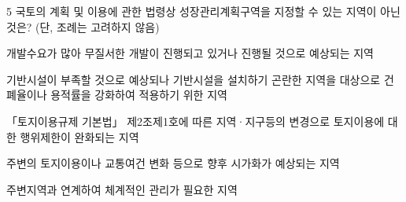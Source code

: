\begin{question}{5}
국토의 계획 및 이용에 관한 법령상 성장관리계획구역을 지정할 수 있는 지역이 아닌 것은? (단, 조례는 고려하지 않음)
\begin{choices}
  \item 개발수요가 많아 무질서한 개발이 진행되고 있거나 진행될 것으로 예상되는 지역
  \item 기반시설이 부족할 것으로 예상되나 기반시설을 설치하기 곤란한 지역을 대상으로 건폐율이나 용적률을 강화하여 적용하기 위한 지역
  \item 「토지이용규제 기본법」 제2조제1호에 따른 지역·지구등의 변경으로 토지이용에 대한 행위제한이 완화되는 지역
  \item 주변의 토지이용이나 교통여건 변화 등으로 향후 시가화가 예상되는 지역
  \item 주변지역과 연계하여 체계적인 관리가 필요한 지역
\end{choices}
\end{question}
